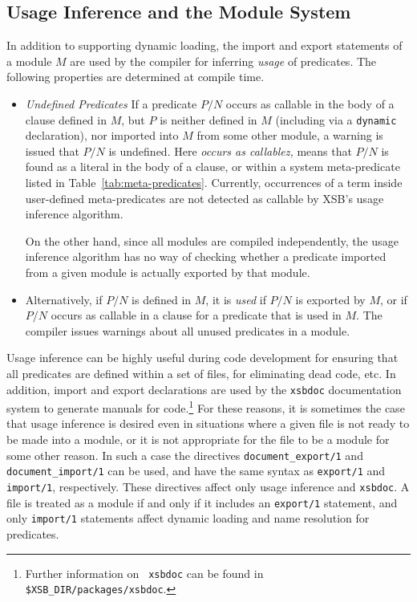 
\subsection{Usage Inference and the Module System} \label{sec:usenfer}
In addition to supporting dynamic loading, the import and export
statements of a module $M$ are used by the compiler for inferring {\em
  usage} of predicates.  The following properties are determined at
compile time.
\begin{itemize}
\item {\em Undefined Predicates} If a predicate $P/N$ occurs as
  callable in the body of a clause defined in $M$, but $P$ is neither
  defined in $M$ (including via a {\tt dynamic} declaration), nor
  imported into $M$ from some other module, a warning is issued that
  $P/N$ is undefined.  Here {\em occurs as callablez,} means that
  $P/N$ is found as a literal in the body of a clause, or within a
  system meta-predicate listed in Table~\ref{tab:meta-predicates}.
  Currently, occurrences of a term inside user-defined meta-predicates
  are not detected as callable by XSB's usage inference algorithm.

    On the other hand, since all modules are compiled independently,
    the usage inference algorithm has no way of checking whether a
    predicate imported from a given module is actually exported by
    that module.
%
\item Alternatively, if $P/N$ is defined in $M$, it is {\em used} if
  $P/N$ is exported by $M$, or if $P/N$ occurs as callable in a clause
  for a predicate that is used in $M$.  The compiler issues warnings
  about all unused predicates in a module.  
\end{itemize}

Usage inference can be highly useful during code development for
ensuring that all predicates are defined within a set of files, for
eliminating dead code, etc.  In addition, import and export
declarations are used by the {\tt xsbdoc} documentation system to
generate manuals for code.\footnote{Further information on {\tt
xsbdoc} can be found in {\tt \$XSB\_DIR/packages/xsbdoc}.}  For these
reasons, it is sometimes the case that usage inference is desired even
in situations where a given file is not ready to be made into a
module, or it is not appropriate for the file to be a module for some
other reason.  In such a case the directives {\tt document\_export/1}
and {\tt document\_import/1} can be used, and have the same syntax as 
{\tt export/1} and {\tt import/1}, respectively.  These directives
affect only usage inference and {\tt xsbdoc}.  A file is treated as a
module if and only if it includes an {\tt export/1} statement, and
only {\tt import/1} statements affect dynamic loading and name
resolution for predicates.

